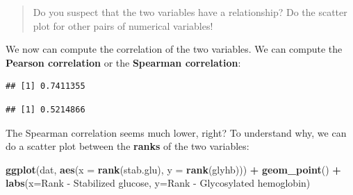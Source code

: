 \documentclass[
]{book}
\newenvironment{Shaded}{\begin{snugshade}}{\end{snugshade}}
\newcommand{\AttributeTok}[1]{\textcolor[rgb]{0.13,0.29,0.53}{#1}}
\newcommand{\DocumentationTok}[1]{\textcolor[rgb]{0.56,0.35,0.01}{\textbf{\textit{#1}}}}
\newcommand{\FunctionTok}[1]{\textcolor[rgb]{0.13,0.29,0.53}{\textbf{#1}}}
\newcommand{\NormalTok}[1]{#1}
\newcommand{\SpecialCharTok}[1]{\textcolor[rgb]{0.81,0.36,0.00}{\textbf{#1}}}
\newcommand{\StringTok}[1]{\textcolor[rgb]{0.31,0.60,0.02}{#1}}
\begin{document}
\begin{quote}
Do you suspect that the two variables have a relationship? Do the scatter plot for other pairs of numerical variables!
\end{quote}

We now can compute the correlation of the two variables. We can compute the \textbf{Pearson correlation} or the \textbf{Spearman correlation}:

\begin{Shaded}
\end{Shaded}

\begin{verbatim}
## [1] 0.7411355
\end{verbatim}

\begin{Shaded}
\end{Shaded}

\begin{verbatim}
## [1] 0.5214866
\end{verbatim}

The Spearman correlation seems much lower, right? To understand why, we can do a scatter plot between the \textbf{ranks} of the two variables:

\begin{Shaded}
\begin{Highlighting}[]
\FunctionTok{ggplot}\NormalTok{(dat,}
       \FunctionTok{aes}\NormalTok{(}\AttributeTok{x =} \FunctionTok{rank}\NormalTok{(stab.glu), }\AttributeTok{y =} \FunctionTok{rank}\NormalTok{(glyhb))) }\SpecialCharTok{+}
  \FunctionTok{geom\_point}\NormalTok{() }\SpecialCharTok{+}
  \FunctionTok{labs}\NormalTok{(}\AttributeTok{x=}\StringTok{\textquotesingle{}Rank {-} Stabilized glucose\textquotesingle{}}\NormalTok{, }\AttributeTok{y=}\StringTok{\textquotesingle{}Rank {-} Glycosylated hemoglobin\textquotesingle{}}\NormalTok{)}
\end{Highlighting}
\end{Shaded}
\end{document}
